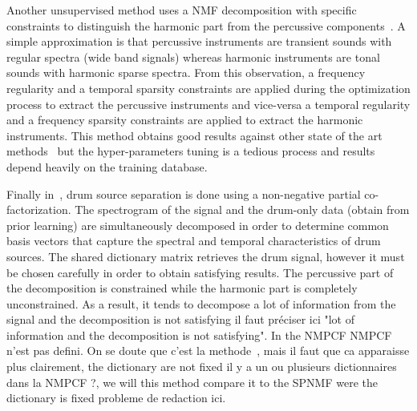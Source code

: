 Another unsupervised method uses a NMF decomposition with specific constraints to distinguish the harmonic part from the percussive components~\cite{canadas2014percussive}. A simple approximation is that percussive instruments are transient sounds with regular spectra (wide band signals) whereas harmonic instruments are tonal sounds with harmonic sparse spectra. From this observation, a frequency regularity and a temporal sparsity constraints are applied during the optimization process to extract the percussive instruments and vice-versa a temporal regularity and a frequency sparsity constraints are applied to extract the harmonic instruments. This method obtains good results against other state of the art methods~\cite{canadas2014percussive} but the hyper-parameters tuning is a tedious process and results depend heavily on the training database.

Finally in~\cite{kim2011nonnegative}, drum source separation is done using a non-negative partial co-factorization. The spectrogram of the signal and the drum-only data (obtain from prior learning) are simultaneously decomposed in order to determine common basis vectors that capture the spectral and temporal characteristics of drum sources. The shared dictionary matrix retrieves the drum signal, however it must be chosen carefully in order to obtain satisfying results. The percussive part of the decomposition is constrained while the harmonic part is completely unconstrained. As a result, it tends to decompose a lot of information from the signal and the decomposition is not satisfying {\MK il faut préciser ici "lot of information and the decomposition is not satisfying"}. In the NMPCF {\MK NMPCF n'est pas defini. On se doute que c'est la methode~\cite{kim2011nonnegative}, mais il faut que ca apparaisse plus clairement}, the dictionary are not fixed {\MK il y a un ou plusieurs dictionnaires dans la NMPCF ?}, we will this method compare it to the SPNMF were the dictionary is fixed {\MK probleme de redaction ici}. 
